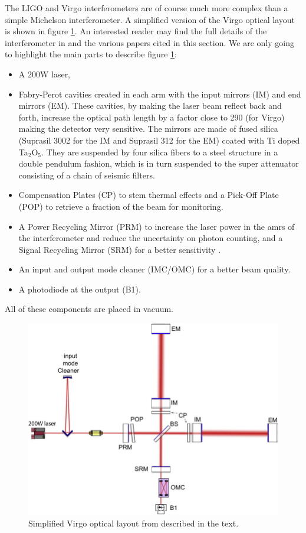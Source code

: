 The LIGO and Virgo interferometers are of course much more complex than a simple Michelson interferometer.
A simplified version of the Virgo optical layout is shown in figure \ref{fig:virgo_layout}.
An interested reader may find the full details of the interferometer in \cite{advanced_virgo,virgo_tech_report} and the various papers cited in this section.
We are only going to highlight the main parts to describe figure \ref{fig:virgo_layout}:
\begin{itemize}
\item A 200W laser,
\item Fabry-Perot cavities created in each arm with the input mirrors (IM) and end mirrors (EM).
  These cavities, by making the laser beam reflect back and forth, increase the  optical path length by a factor close to 290 (for Virgo) making the detector very sensitive.
  The mirrors are made of fused silica (Suprasil 3002 for the IM and Suprasil 312 for the EM) coated with Ti doped Ta$_2$O$_5$.
  They are suspended by four silica fibers to a steel structure in a double pendulum fashion, which is in turn suspended to the super attenuator consisting of a chain of seismic filters.
\item Compensation Plates (CP) to stem thermal effects and a Pick-Off Plate (POP) to retrieve a fraction of the beam for monitoring.
\item A Power Recycling Mirror (PRM) to increase the laser power in the amrs of the interferometer and reduce the uncertainty on photon counting, and a Signal Recycling Mirror (SRM) for a better sensitivity \cite{recycling1,recycling2}.
\item An input and output mode cleaner (IMC/OMC) for a better beam quality.
\item A photodiode at the output (B1).
\end{itemize}
All of these components are placed in vacuum.
%
\begin{figure}
  \centering
  \includegraphics[width=0.5\linewidth]{sectionDetection/simple_virgo_layout.png}
  \caption{Simplified Virgo optical layout from \cite{advanced_virgo} described in the text.}
  \label{fig:virgo_layout}
\end{figure}
%

